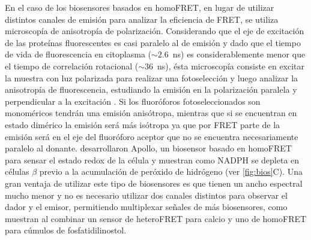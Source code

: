 En el caso de los biosensores basados en homoFRET, en lugar de utilizar distintos canales de emisión para analizar la eficiencia de FRET, se utiliza microscopía de anisotropía de polarización. Considerando que el eje de excitación de las proteínas fluorescentes es casi paralelo al de emisión y dado que el tiempo de vida de fluorescencia en citoplasma ($\sim2.6$~ns) es considerablemente menor que el tiempo de correlación rotacional ($\sim36$~ns), ésta microscopía consiste en excitar la muestra con luz polarizada para realizar una fotoselección y luego analizar la anisotropía de fluorescencia, estudiando la emisión en la polarización paralela y perpendicular a la excitación  \citep{Swaminathan1997}. Si los fluoróforos fotoseleccionados son monoméricos tendrán una emisión anisótropa, mientras que si se encuentran en estado dimérico la emisión será más isótropa ya que por FRET parte de la emisión será en el eje del fluoróforo aceptor que no se encuentra necesariamente paralelo al donante. \cite{Cameron2016} desarrollaron Apollo, un biosensor basado en homoFRET para sensar el estado redox de la célula y muestran como NADPH se depleta en células $\beta$ previo a la acumulación de peróxido de hidrógeno (ver \cref{fig:bios}C). Una gran ventaja de utilizar este tipo de biosensores es que tienen un ancho espectral mucho menor y no es necesario utilizar dos canales distintos para observar el dador y el emisor, permitiendo multiplexar señales de más biosensores, como muestran \cite{Warren2015} al combinar un sensor de heteroFRET para calcio y uno de homoFRET para cúmulos de fosfatidilinostol.


